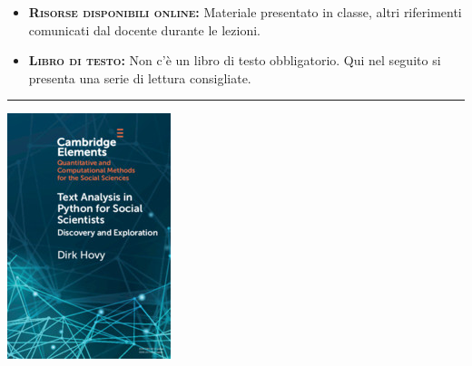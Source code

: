 \documentclass[11pt, a4paper]{article}
\begin{document}
\begin{itemize}[itemsep=4pt,parsep=0pt,topsep=1pt,partopsep=1pt]
	\item[\color{darkblue}\faNewspaperO] \textbf{\textsc{Risorse disponibili online:}}
	Materiale presentato in classe, altri riferimenti comunicati dal docente durante le lezioni.  
		
	\item[\color{darkblue}\faBook] \textbf{\textsc{Libro di testo:}} Non c'\`{e} un libro di testo obbligatorio. Qui nel seguito si presenta una serie di lettura consigliate.
\end{itemize}
\vspace{.4cm}
\hrule
\vspace{.4cm}
\begin{minipage}[b]{0.17\linewidth}          
	\includegraphics[width=.95\linewidth]{Sillabo/images/TextAnalysisInPythonForSocialScientists.jpg}
\end{minipage}\hfill
\end{document}
